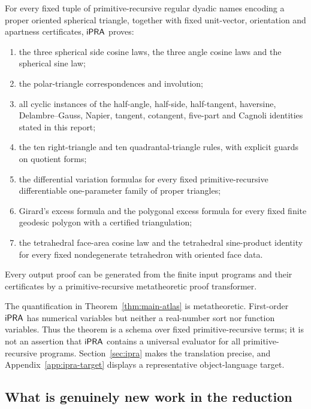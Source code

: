 \begin{theorem}
\label{thm:main-atlas}
For every fixed tuple of primitive-recursive regular dyadic names encoding a
proper oriented spherical triangle, together with fixed unit-vector,
orientation and apartness certificates, \(\mathsf{iPRA}\) proves:
\begin{enumerate}[label=\textup{(\alph*)}]
\item the three spherical side cosine laws, the three angle cosine laws and the
spherical sine law;
\item the polar-triangle correspondences and involution;
\item all cyclic instances of the half-angle, half-side, half-tangent,
haversine, Delambre--Gauss, Napier, tangent, cotangent, five-part and Cagnoli
identities stated in this report;
\item the ten right-triangle and ten quadrantal-triangle rules, with explicit
guards on quotient forms;
\item the differential variation formulas for every fixed primitive-recursive
differentiable one-parameter family of proper triangles;
\item Girard's excess formula and the polygonal excess formula for every fixed
finite geodesic polygon with a certified triangulation;
\item the tetrahedral face-area cosine law and the tetrahedral sine-product
identity for every fixed nondegenerate tetrahedron with oriented face data.
\end{enumerate}
Every output proof can be generated from the finite input programs and their
certificates by a primitive-recursive metatheoretic proof transformer.
\end{theorem}

The quantification in Theorem~\ref{thm:main-atlas} is metatheoretic.  First-order
\(\mathsf{iPRA}\) has numerical variables but neither a real-number sort nor function
variables.  Thus the theorem is a schema over fixed primitive-recursive terms;
it is not an assertion that \(\mathsf{iPRA}\) contains a universal evaluator for all
primitive-recursive programs.  Section~\ref{sec:ipra} makes the translation
precise, and Appendix~\ref{app:ipra-target} displays a representative
object-language target.

\subsection{What is genuinely new work in the reduction}

